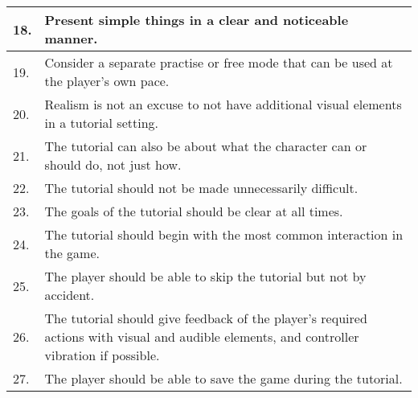\begin{center}
\begin{tabularx}{\textwidth}{|l|X|}
		18. & Present simple things in a clear and noticeable manner. \\ \hline
		19. & Consider a separate practise or free mode that can be used at the player's own pace. \\ \hline
		20. & Realism is not an excuse to not have additional visual elements in a tutorial setting. \\ \hline
		21. & The tutorial can also be about what the character can or should do, not just how. \\ \hline
		22. & The tutorial should not be made unnecessarily difficult. \\ \hline
		23. & The goals of the tutorial should be clear at all times. \\ \hline
		24. & The tutorial should begin with the most common interaction in the game. \\ \hline
		25. & The player should be able to skip the tutorial but not by accident. \\ \hline
		26. & The tutorial should give feedback of the player's required actions with visual and audible elements, and controller vibration if possible. \\ \hline
		27. & The player should be able to save the game during the tutorial. \\ \hline
	\end{tabularx}
\end{center}